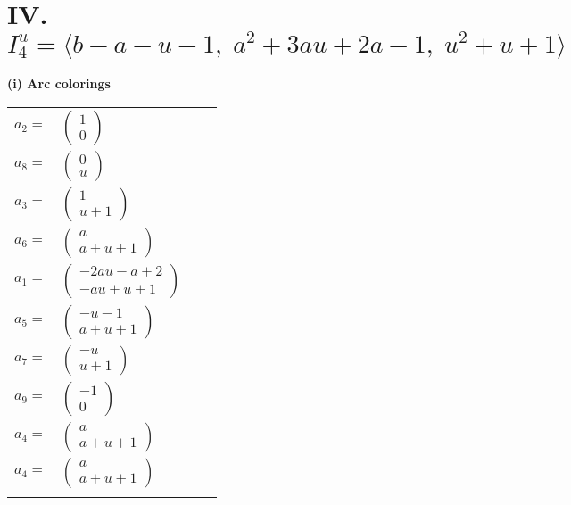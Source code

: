 \documentclass[1p]{elsarticle_modified}
\theoremstyle{definition}
\begin{document}
\centering \section*{IV. $I^u_{4}= \langle b- a- u-1,\;a^2+3 a u+2 a-1,\;u^2+u+1 \rangle$}
\flushleft \textbf{(i) Arc colorings}\\
\begin{tabular}{m{7pt} m{180pt} m{7pt} m{180pt} }
\flushright $a_{2}=$&$\begin{pmatrix}1\\0\end{pmatrix}$ \\
\flushright $a_{8}=$&$\begin{pmatrix}0\\u\end{pmatrix}$ \\
\flushright $a_{3}=$&$\begin{pmatrix}1\\u+1\end{pmatrix}$ \\
\flushright $a_{6}=$&$\begin{pmatrix}a\\a+u+1\end{pmatrix}$ \\
\flushright $a_{1}=$&$\begin{pmatrix}-2 a u- a+2\\- a u+u+1\end{pmatrix}$ \\
\flushright $a_{5}=$&$\begin{pmatrix}- u-1\\a+u+1\end{pmatrix}$ \\
\flushright $a_{7}=$&$\begin{pmatrix}- u\\u+1\end{pmatrix}$ \\
\flushright $a_{9}=$&$\begin{pmatrix}-1\\0\end{pmatrix}$ \\
\flushright $a_{4}=$&$\begin{pmatrix}a\\a+u+1\end{pmatrix}$\\ \flushright $a_{4}=$&$\begin{pmatrix}a\\a+u+1\end{pmatrix}$\\&\end{tabular}
\end{document}
